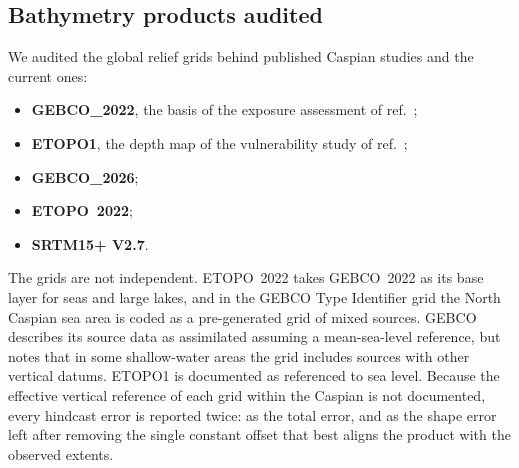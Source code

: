 \subsection*{Bathymetry products audited}
We audited the global relief grids behind published Caspian studies and the current ones:
\begin{itemize}
  \item \textbf{GEBCO\_2022}\citep{gebco2022}, the basis of the exposure assessment of ref.~;
  \item \textbf{ETOPO1}\citep{amante2009}, the depth map of the vulnerability study of ref.~;
  \item \textbf{GEBCO\_2026}\citep{gebco2026};
  \item \textbf{ETOPO~2022}\citep{etopo2022,macferrin2025};
  \item \textbf{SRTM15+ V2.7}\citep{tozer2019}.
\end{itemize}
The grids are not independent. ETOPO~2022 takes GEBCO~2022 as its base layer for seas and large lakes\citep{macferrin2025}, and in the GEBCO Type Identifier grid the North Caspian sea area is coded as a pre-generated grid of mixed sources\citep{gebco2026}. GEBCO describes its source data as assimilated assuming a mean-sea-level reference, but notes that in some shallow-water areas the grid includes sources with other vertical datums\citep{gebco2026}. ETOPO1 is documented as referenced to sea level\citep{amante2009}. Because the effective vertical reference of each grid within the Caspian is not documented, every hindcast error is reported twice: as the total error, and as the shape error left after removing the single constant offset that best aligns the product with the observed extents.
